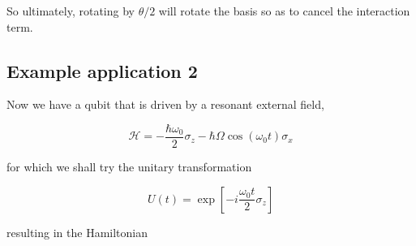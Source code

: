   
  \noindent So ultimately, rotating by $ \theta/2 $ will rotate the basis so as to cancel the interaction term.
  
 \subsection{Example application 2\label{subsec:Rabi}}
  Now we have a qubit that is driven by a resonant external field, 
  
  \begin{equation}\label{app2}
  	\mathcal{H} = -\frac{\hbar\omega_0}{2}\sigma_z-\hbar\Omega\cos(\omega_0 t)\sigma_x
  \end{equation}
  
  \noindent for which we shall try the unitary transformation
  
  \begin{equation}\label{app2Try}
  	U(t) = \exp\left[-i\frac{\omega_0 t}{2}\sigma_z\right]
  \end{equation}  
  
  \noindent resulting in the Hamiltonian 
  
